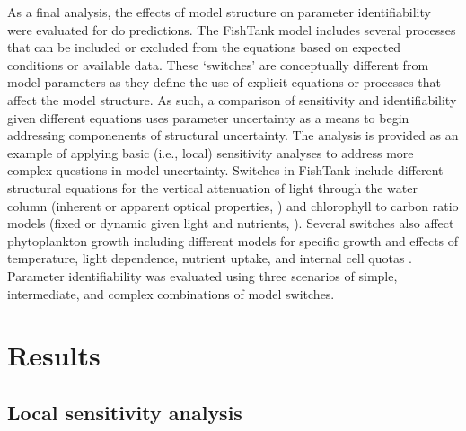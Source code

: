 \documentclass[letterpaper,12pt,oneside]{article}\usepackage[]{graphicx}\usepackage[]{color}
\begin{document}
As a final analysis, the effects of model structure on parameter identifiability were evaluated for \ac{do} predictions.  The FishTank model includes several processes that can be included or excluded from the equations based on expected conditions or available data.  These `switches' are conceptually different from model parameters as they define the use of explicit equations or processes that affect the model structure.  As such, a comparison of sensitivity and identifiability given different equations uses parameter uncertainty as a means to begin addressing componenents of structural uncertainty.  The analysis is provided as an example of applying basic (i.e., local) sensitivity analyses to address more complex questions in model uncertainty.  Switches in FishTank include different structural equations for the vertical attenuation of light through the water column (inherent or apparent optical properties, \citealt{Penta09,Eldridge10}) and chlorophyll to carbon ratio models (fixed or dynamic given light and nutrients, \citealt{Cloern95}).  Several switches also affect phytoplankton growth including different models for specific growth and effects of temperature, light dependence, nutrient uptake, and internal cell quotas .  Parameter identifiability was evaluated using three scenarios of simple, intermediate, and complex combinations of model switches.  

\section{Results}



\subsection{Local sensitivity analysis}
\end{document}
